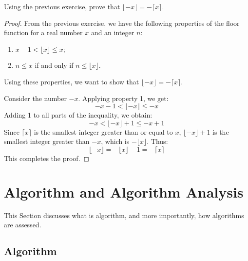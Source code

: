 \documentclass[
	12pt, %
	fleqn, %
	a4paper, %
]{LegrandOrangeBook}
\begin{document}
        \begin{exercise}
            Using the previous exercise, prove that \( \lfloor -x \rfloor = -\lceil x \rceil \).
            \end{exercise}
            
            \begin{proof}
                From the previous exercise, we have the following properties of the floor function for a real number \( x \) and an integer \( n \):
                \begin{enumerate}
                    \item \( x - 1 < \lfloor x \rfloor \leq x \);
                    \item \( n \leq x \) if and only if \( n \leq \lfloor x \rfloor \).
                \end{enumerate}
                Using these properties, we want to show that \( \lfloor -x \rfloor = -\lceil x \rceil \).
                
                Consider the number \( -x \). Applying property 1, we get:
                \[ -x - 1 < \lfloor -x \rfloor \leq -x \]
                Adding 1 to all parts of the inequality, we obtain:
                \[ -x < \lfloor -x \rfloor + 1 \leq -x + 1 \]
                Since \( \lceil x \rceil \) is the smallest integer greater than or equal to \( x \), \( \lfloor -x \rfloor + 1 \) is the smallest integer greater than \( -x \), which is \( -\lfloor x \rfloor \). Thus:
                \[ \lfloor -x \rfloor = -\lfloor x \rfloor - 1 = -\lceil x \rceil \]
                This completes the proof.
            \end{proof}






\section{Algorithm and Algorithm Analysis}
	This Section discusses what is algorithm, and more importantly, how algorithms
	are assessed.

    \subsection{Algorithm}
\end{document}
